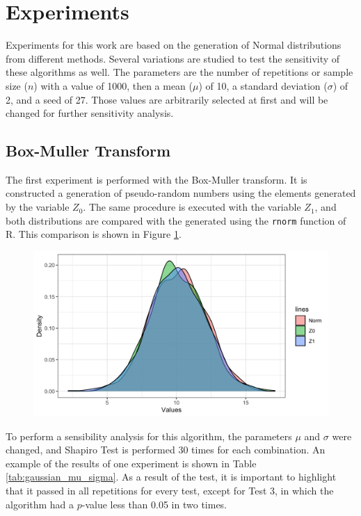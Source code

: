 \documentclass[10pt,leter,openany]{article}
\begin{document}
\section{Experiments}
	
	Experiments for this work are based on the generation of Normal distributions from different methods. Several variations are studied to test the sensitivity of these algorithms as well. The parameters are the number of repetitions or sample size ($ n $) with a value of 1000, then a mean ($\mu$) of 10, a standard deviation ($\sigma$) of 2, and a seed of 27. Those values are arbitrarily selected at first and will be changed for further sensitivity analysis. 
	
	\subsection{Box-Muller Transform}
	
		The first experiment is performed with the Box-Muller transform. It is constructed a generation of pseudo-random numbers using the elements generated by the variable $Z_{0}$. The same procedure is executed with the variable $Z_{1}$, and both distributions are compared with the generated using the \texttt{rnorm} function of R. This comparison is shown in Figure \ref{fig:dens1}.
	
			\begin{figure}
				\begin{center}
					\includegraphics[scale=0.29]{extras/densplot1}
					\label{fig:dens1}
				\end{center}
			\end{figure}
		
		
		To perform a sensibility analysis for this algorithm, the parameters $\mu$ and $\sigma$ were changed, and Shapiro Test is performed 30 times for each combination. An example of the results of one experiment is shown in Table \ref{tab:gaussian_mu_sigma}. As a result of the test, it is important to highlight that it passed in all repetitions for every test, except for Test 3, in which the algorithm had a $p$-value less than 0.05 in two times.
		
\end{document}
